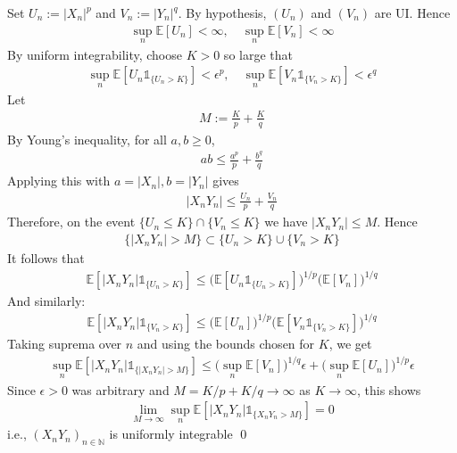 \documentclass[10pt]{article}
\begin{document}
Set $U_n := |X_n|^p$ and $V_n := |Y_n|^q$. By hypothesis, $(U_n)$ and $(V_n)$ are UI. Hence 
\begin{gather*}
    \sup_n \mathbb{E}[U_n] < \infty, \quad \sup_n \mathbb{E}[V_n] < \infty
\end{gather*}
By uniform integrability, choose $K > 0$ so large that 
\begin{gather*}
    \sup_n \mathbb{E}[U_n \mathbb{1}_{\{U_n > K\}}] < \epsilon^p, \quad \sup_n \mathbb{E}[V_n \mathbb{1}_{\{V_n > K\}}] < \epsilon^q
\end{gather*}
Let
\begin{gather*}
    M := \frac{K}{p} + \frac{K}{q}
\end{gather*}
By Young's inequality, for all $a, b \ge 0$,
\begin{gather*}
    ab \le \frac{a^p}{p} + \frac{b^q}{q}
\end{gather*}
Applying this with $a = |X_n|, b = |Y_n|$ gives 
\begin{gather*}
    |X_nY_n| \le \frac{U_n}{p} + \frac{V_n}{q}
\end{gather*}
Therefore, on the event $\{U_n \le K\} \cap \{V_n \le K\}$ we have $|X_nY_n| \le M$. Hence 
\begin{gather*}
    \{|X_nY_n| > M\} \subset \{U_n > K\} \cup \{V_n > K\}
\end{gather*}
It follows that 
\begin{gather*}
    \mathbb{E}[|X_nY_n|\mathbb{1}_{\{U_n > K\}}] \le \big(\mathbb{E}[U_n \mathbb{1}_{\{U_n > K\}}]\big)^{1/p}\big(\mathbb{E}[V_n]\big)^{1/q}
\end{gather*}
And similarly:
\begin{gather*}
    \mathbb{E}[|X_nY_n|\mathbb{1}_{\{V_n > K\}}] \le \big(\mathbb{E}[U_n]\big)^{1/p}\big(\mathbb{E}[V_n \mathbb{1}_{\{V_n > K\}}]\big)^{1/q}
\end{gather*}
Taking suprema over $n$ and using the bounds chosen for $K$, we get
\begin{gather*}
    \sup_n \mathbb{E}[|X_nY_n|\mathbb{1}_{\{|X_nY_n| > M\}}] \le \big(\sup_n \mathbb{E}[V_n]\big)^{1/q}\epsilon + \big(\sup_n \mathbb{E}[U_n]\big)^{1/p}\epsilon
\end{gather*}
Since $\epsilon > 0$ was arbitrary and $M = K/p + K/q \to \infty$ as $K \to \infty$, this shows 
\begin{gather*}
    \lim_{M \to \infty}\sup_{n}\mathbb{E}[|X_nY_n|\mathbb{1}_{\{X_nY_n > M\}}] = 0
\end{gather*}
i.e., $(X_nY_n)_{n \in \mathbb{N}}$ is uniformly integrable \qed
\end{document}
